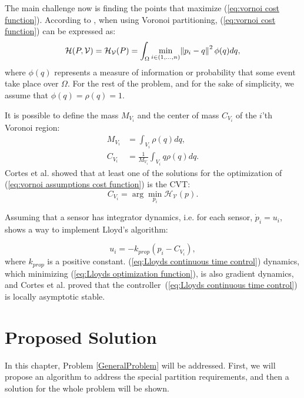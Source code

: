 \documentclass{iacas}
\begin{document}
The main challenge now is finding the points that maximize (\ref{eq:vornoi cost function}). According to \cite{Cortes2004}, when using Voronoi partitioning, (\ref{eq:vornoi cost function}) can be expressed as:
\begin{equation}
\mathcal{H}(P, \mathcal{V}) = \mathcal{H}_{\mathcal{V}}(P) = \int_{\Omega} \min_{i \in (1,\ldots, n)} \norm{p_i-q}^2 \phi(q) dq,
\label{eq:vornoi assumptions cost function}
\end{equation}
where $\phi(q)$ represents a measure of information or probability that some event take place over $\Omega$. For the rest of the problem, and for the sake of simplicity, we assume that $\phi(q) = \rho(q) = 1$.

It is possible to define the mass $M_{V_i}$ and the center of mass $C_{V_i}$ of the $i$'th Voronoi region:
\begin{align*}
M_{V_i} &= \int_{V_i} \rho(q)dq, \\
C_{V_i} &= \frac{1}{M_{V_i}} \int_{V_i} q\rho(q)dq.
\end{align*}
Cortes et al. \cite{Cortes2004} showed that at least one of the solutions for the optimization of (\ref{eq:vornoi assumptions cost function}) is the CVT:
\begin{equation}
C_{V_i} = \arg\min_{p_i} \mathcal{H}_{\mathcal{V}}(p).
\end{equation}

Assuming that a sensor has integrator dynamics, i.e. for each sensor, $\dot{p}_i = u_i$, \cite{Cortes2004} shows a way to implement Lloyd's algorithm:

\begin{equation} \label{eq:Lloyds continuous time control}
u_{i} = -k_{prop}\left( p_i - C_{V_{i}} \right),
\end{equation} 
where $k_{prop}$ is a positive constant. (\ref{eq:Lloyds continuous time control}) dynamics, which minimizing (\ref{eq:Lloyds optimization function}), is also gradient dynamics, and Cortes et al. \cite{Cortes2004} proved that the controller~(\ref{eq:Lloyds continuous time control}) is locally asymptotic stable.


\section{Proposed Solution}

In this chapter, Problem \ref{GeneralProblem} will be addressed. First, we will propose an algorithm to address the special partition requirements, and then a solution for the whole problem will be shown.
\end{document}
